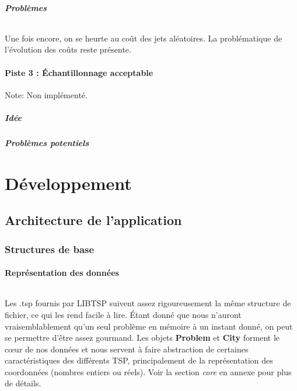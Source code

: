 \documentclass[a4paper,10pt]{report}
\begin{document}

\subsubsection{Problèmes}

\paragraph{}
  Une fois encore, on se heurte au coût des jets aléatoires. La problématique de l'évolution des coûts reste
présente.


\pagebreak
\subsection{Piste 3 : Échantillonnage acceptable}
Note: Non implémenté.
\subsubsection{Idée}

\subsubsection{Problèmes potentiels}


\part{Développement}
\chapter{Architecture de l'application}
\section{Structures de base}
\subsection{Représentation des données}
\paragraph{}
  Les .tsp fournis par LIBTSP suivent assez rigoureusement la même structure de fichier, ce qui les rend
facile à lire. Étant donné que nous n'auront vraisemblablement qu'un seul problème en mémoire à un instant
donné, on peut se permettre d'être assez gourmand. Les objets \textbf{Problem} et \textbf{City} forment le
cœur de nos données et nous servent à faire abstraction de certaines caractéristiques des différents TSP,
principalement de la représentation des coordonnées (nombres entiers ou réels). Voir la section \textit{core}
en annexe pour plus de détails.
\end{document}
